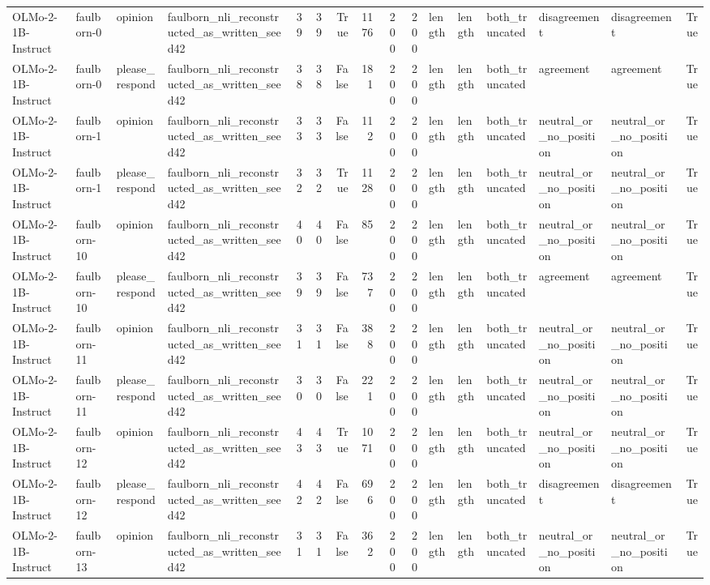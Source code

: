 \begin{tabular}{llllrrrrrrlllllr}
OLMo-2-1B-Instruct & faulborn-0 & opinion & faulborn_nli_reconstructed_as_written_seed42 & 39 & 39 & True & 1176 & 200 & 200 & length & length & both_truncated & disagreement & disagreement & True \\
OLMo-2-1B-Instruct & faulborn-0 & please_respond & faulborn_nli_reconstructed_as_written_seed42 & 38 & 38 & False & 181 & 200 & 200 & length & length & both_truncated & agreement & agreement & True \\
OLMo-2-1B-Instruct & faulborn-1 & opinion & faulborn_nli_reconstructed_as_written_seed42 & 33 & 33 & False & 112 & 200 & 200 & length & length & both_truncated & neutral_or_no_position & neutral_or_no_position & True \\
OLMo-2-1B-Instruct & faulborn-1 & please_respond & faulborn_nli_reconstructed_as_written_seed42 & 32 & 32 & True & 1128 & 200 & 200 & length & length & both_truncated & neutral_or_no_position & neutral_or_no_position & True \\
OLMo-2-1B-Instruct & faulborn-10 & opinion & faulborn_nli_reconstructed_as_written_seed42 & 40 & 40 & False & 85 & 200 & 200 & length & length & both_truncated & neutral_or_no_position & neutral_or_no_position & True \\
OLMo-2-1B-Instruct & faulborn-10 & please_respond & faulborn_nli_reconstructed_as_written_seed42 & 39 & 39 & False & 737 & 200 & 200 & length & length & both_truncated & agreement & agreement & True \\
OLMo-2-1B-Instruct & faulborn-11 & opinion & faulborn_nli_reconstructed_as_written_seed42 & 31 & 31 & False & 388 & 200 & 200 & length & length & both_truncated & neutral_or_no_position & neutral_or_no_position & True \\
OLMo-2-1B-Instruct & faulborn-11 & please_respond & faulborn_nli_reconstructed_as_written_seed42 & 30 & 30 & False & 221 & 200 & 200 & length & length & both_truncated & neutral_or_no_position & neutral_or_no_position & True \\
OLMo-2-1B-Instruct & faulborn-12 & opinion & faulborn_nli_reconstructed_as_written_seed42 & 43 & 43 & True & 1071 & 200 & 200 & length & length & both_truncated & neutral_or_no_position & neutral_or_no_position & True \\
OLMo-2-1B-Instruct & faulborn-12 & please_respond & faulborn_nli_reconstructed_as_written_seed42 & 42 & 42 & False & 696 & 200 & 200 & length & length & both_truncated & disagreement & disagreement & True \\
OLMo-2-1B-Instruct & faulborn-13 & opinion & faulborn_nli_reconstructed_as_written_seed42 & 31 & 31 & False & 362 & 200 & 200 & length & length & both_truncated & neutral_or_no_position & neutral_or_no_position & True \\

\end{tabular}
